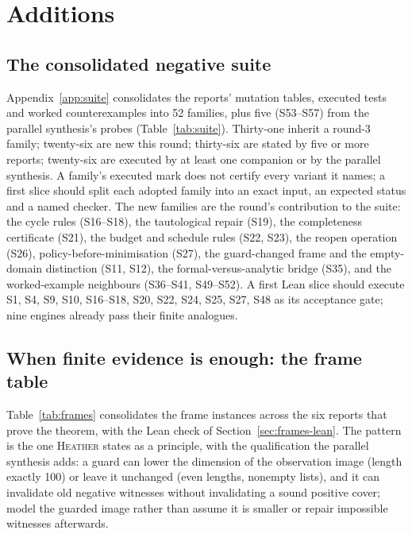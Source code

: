 \documentclass[11pt,a4paper]{article}
\newcommand{\He}{\textsc{Heather}}
\theoremstyle{definition}
\theoremstyle{plain}
\begin{document}
\section{Additions}\label{sec:additions}

\subsection{The consolidated negative suite}\label{sec:suite}
Appendix~\ref{app:suite} consolidates the reports' mutation tables, executed tests and worked counterexamples into 52 families, plus five (S53--S57) from the parallel synthesis's probes (Table~\ref{tab:suite}). Thirty-one inherit a round-3 family; twenty-six are new this round; thirty-six are stated by five or more reports; twenty-six are executed by at least one companion or by the parallel synthesis. A family's executed mark does not certify every variant it names; a first slice should split each adopted family into an exact input, an expected status and a named checker. The new families are the round's contribution to the suite: the cycle rules (S16--S18), the tautological repair (S19), the completeness certificate (S21), the budget and schedule rules (S22, S23), the reopen operation (S26), policy-before-minimisation (S27), the guard-changed frame and the empty-domain distinction (S11, S12), the formal-versus-analytic bridge (S35), and the worked-example neighbours (S36--S41, S49--S52). A first Lean slice should execute S1, S4, S9, S10, S16--S18, S20, S22, S24, S25, S27, S48 as its acceptance gate; nine engines already pass their finite analogues.

\subsection{When finite evidence is enough: the frame table}\label{sec:completeness}
Table~\ref{tab:frames} consolidates the frame instances across the six reports that prove the theorem, with the Lean check of Section~\ref{sec:frames-lean}. The pattern is the one \He{} states as a principle, with the qualification the parallel synthesis adds: a guard can lower the dimension of the observation image (length exactly 100) or leave it unchanged (even lengths, nonempty lists), and it can invalidate old negative witnesses without invalidating a sound positive cover; model the guarded image rather than assume it is smaller or repair impossible witnesses afterwards.
\end{document}
